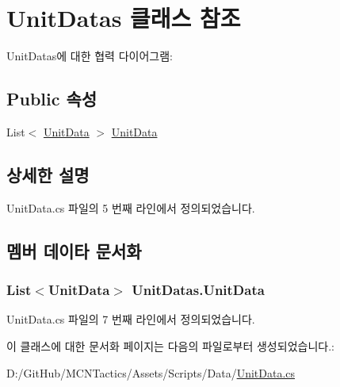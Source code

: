 \hypertarget{class_unit_datas}{}\section{Unit\+Datas 클래스 참조}
\label{class_unit_datas}


Unit\+Datas에 대한 협력 다이어그램\+:
\subsection*{Public 속성}
\begin{DoxyCompactItemize}
\item 
List$<$ \hyperlink{class_unit_data}{Unit\+Data} $>$ \hyperlink{class_unit_datas_a3f2f1ca9117d1c2431ae1b5c17e1bafe}{Unit\+Data}
\end{DoxyCompactItemize}


\subsection{상세한 설명}


Unit\+Data.\+cs 파일의 5 번째 라인에서 정의되었습니다.



\subsection{멤버 데이타 문서화}
\subsubsection[{\texorpdfstring{Unit\+Data}{UnitData}}]{\setlength{\rightskip}{0pt plus 5cm}List$<${\bf Unit\+Data}$>$ Unit\+Datas.\+Unit\+Data}\hypertarget{class_unit_datas_a3f2f1ca9117d1c2431ae1b5c17e1bafe}{}\label{class_unit_datas_a3f2f1ca9117d1c2431ae1b5c17e1bafe}


Unit\+Data.\+cs 파일의 7 번째 라인에서 정의되었습니다.



이 클래스에 대한 문서화 페이지는 다음의 파일로부터 생성되었습니다.\+:\begin{DoxyCompactItemize}
\item 
D\+:/\+Git\+Hub/\+M\+C\+N\+Tactics/\+Assets/\+Scripts/\+Data/\hyperlink{_unit_data_8cs}{Unit\+Data.\+cs}\end{DoxyCompactItemize}
